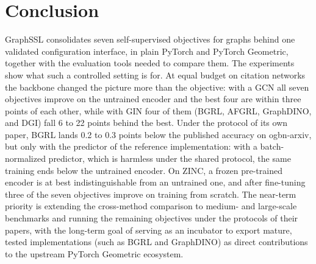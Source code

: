 \documentclass[conference]{IEEEtran}
\begin{document}
\section{Conclusion}
GraphSSL consolidates seven self-supervised objectives for graphs behind one validated configuration interface, in plain PyTorch and PyTorch Geometric, together with the evaluation tools needed to compare them. The experiments show what such a controlled setting is for. At equal budget on citation networks the backbone changed the picture more than the objective: with a GCN all seven objectives improve on the untrained encoder and the best four are within three points of each other, while with GIN four of them (BGRL, AFGRL, GraphDINO, and DGI) fall 6 to 22 points behind the best. Under the protocol of its own paper, BGRL lands 0.2 to 0.3 points below the published accuracy on ogbn-arxiv, but only with the predictor of the reference implementation: with a batch-normalized predictor, which is harmless under the shared protocol, the same training ends below the untrained encoder. On ZINC, a frozen pre-trained encoder is at best indistinguishable from an untrained one, and after fine-tuning three of the seven objectives improve on training from scratch. The near-term priority is extending the cross-method comparison to medium- and large-scale benchmarks and running the remaining objectives under the protocols of their papers, with the long-term goal of serving as an incubator to export mature, tested implementations (such as BGRL and GraphDINO) as direct contributions to the upstream PyTorch Geometric ecosystem.
\end{document}
